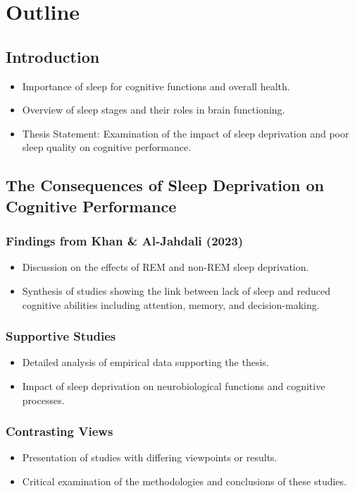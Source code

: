 \section{Outline}

\subsection{Introduction}
\begin{itemize}
    \item Importance of sleep for cognitive functions and overall health.
    \item Overview of sleep stages and their roles in brain functioning.
    \item Thesis Statement: Examination of the impact of sleep deprivation and poor sleep quality on cognitive performance.
\end{itemize}

\subsection{The Consequences of Sleep Deprivation on Cognitive Performance}
\subsubsection{Findings from Khan \& Al-Jahdali (2023)}
\begin{itemize}
    \item Discussion on the effects of REM and non-REM sleep deprivation.
    \item Synthesis of studies showing the link between lack of sleep and reduced cognitive abilities including attention, memory, and decision-making.
\end{itemize}
\subsubsection{Supportive Studies}
\begin{itemize}
    \item Detailed analysis of empirical data supporting the thesis.
    \item Impact of sleep deprivation on neurobiological functions and cognitive processes.
\end{itemize}
\subsubsection{Contrasting Views}
\begin{itemize}
    \item Presentation of studies with differing viewpoints or results.
    \item Critical examination of the methodologies and conclusions of these studies.
\end{itemize}
